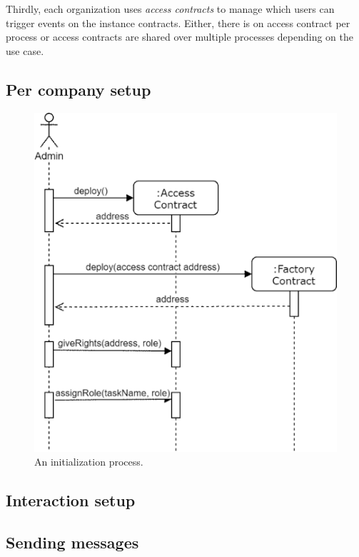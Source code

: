 \documentclass[runningheads]{llncs}
\begin{document}
Thirdly, each organization uses \emph{access contracts} to manage which users can trigger events on the instance contracts.
Either, there is on access contract per process or access contracts are shared over multiple processes depending on the use case.


\subsection{Per company setup}

\begin{figure}
	\includegraphics[width=\textwidth]{fig/initialization.eps}
	\caption{An initialization process.} \label{fig2}
\end{figure}

\subsection{Interaction setup}

\subsection{Sending messages}
\end{document}
